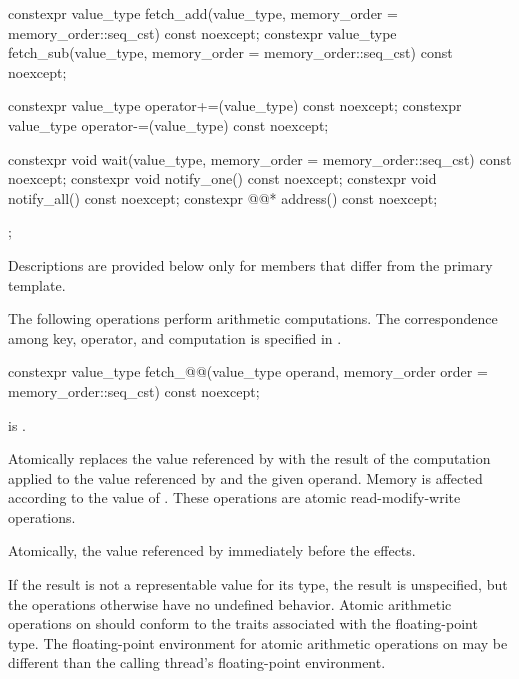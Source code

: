 \begin{codeblock}
{{    constexpr value_type fetch_add(value_type,
                                  memory_order = memory_order::seq_cst) const noexcept;
    constexpr value_type fetch_sub(value_type,
                                  memory_order = memory_order::seq_cst) const noexcept;

    constexpr value_type operator+=(value_type) const noexcept;
    constexpr value_type operator-=(value_type) const noexcept;

    constexpr void wait(value_type,
                        memory_order = memory_order::seq_cst) const noexcept;
    constexpr void notify_one() const noexcept;
    constexpr void notify_all() const noexcept;
    constexpr @@* address() const noexcept;
  };
}
\end{codeblock}

\pnum
Descriptions are provided below only for members
that differ from the primary template.

\pnum
The following operations perform arithmetic computations.
The correspondence among key, operator, and computation is specified
in .

%
%
\begin{itemdecl}
constexpr value_type fetch_@@(value_type operand,
                          memory_order order = memory_order::seq_cst) const noexcept;
\end{itemdecl}

\begin{itemdescr}
\pnum
\constraints
{} is .

\pnum
\effects
Atomically replaces the value referenced by  with
the result of the computation applied to the value referenced by 
and the given operand.
Memory is affected according to the value of .
These operations are atomic read-modify-write operations.

\pnum
\returns
Atomically, the value referenced by 
immediately before the effects.

\pnum
\remarks
If the result is not a representable value for its type,
the result is unspecified,
but the operations otherwise have no undefined behavior.
Atomic arithmetic operations on  should conform to
the  traits
associated with the floating-point type.
The floating-point environment
for atomic arithmetic operations on 
may be different than the calling thread's floating-point environment.
\end{itemdescr}

